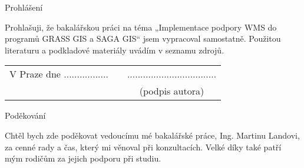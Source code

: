\newcommand{\odsaditodzhora}{\hskip1pt\vfill}

\odsaditodzhora
\noindent Prohlášení

Prohlašuji, že bakalářskou práci na téma „Implementace podpory WMS 
do programů GRASS GIS a SAGA GIS“ jsem vypracoval samostatně. Pou\-žitou
literaturu a podkladové materiály uvádím v seznamu
zdrojů.


\begin{flushleft}
\begin{tabular}{cp{}c}
V Praze dne .................
& 
&
..................................
\\
&&
(podpis autora)
\end{tabular}

\end{flushleft}
\newpage

\odsaditodzhora
\noindent Poděkování

Chtěl bych zde poděkovat vedoucímu mé bakalářské práce, Ing. Martinu Landovi, za 
cenné rady a čas, který mi věnoval při konzultacích.  Velké díky také patří mým
rodičům za jejich podporu při studiu.
\newpage
